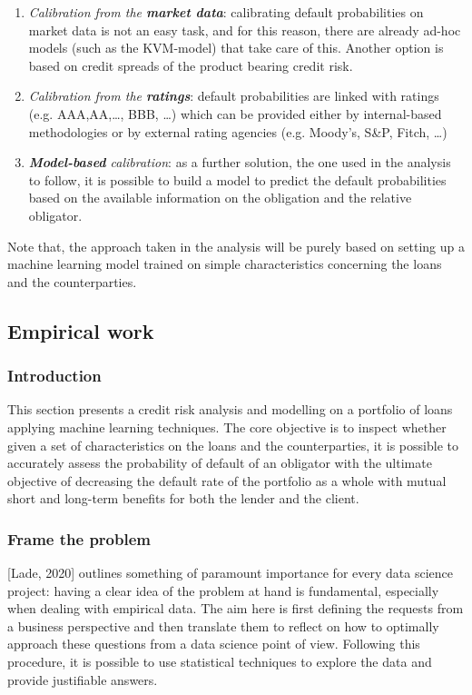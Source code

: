 \documentclass[a4paper,12pt]{article}
\begin{document}
    \begin{enumerate}     
        \item \textit{Calibration from the \textbf{market data}}: calibrating default probabilities on market data is not an easy task, and for this reason, there are already ad-hoc models (such as the KVM-model) that take care of this. Another option is based on credit spreads of the product bearing credit risk.     
        \item \textit{Calibration from the \textbf{ratings}}: default probabilities are linked with ratings (e.g. AAA,AA,\dots, BBB, \dots) which can be provided either by internal-based methodologies or by external rating agencies (e.g. Moody's, S\&P, Fitch, \dots)     
        \item \textit{\textbf{Model-based} calibration}: as a further solution, the one used in the analysis to follow, it is possible to build a model to predict the default probabilities based on the available information on the obligation and the relative obligator. 
    \end{enumerate}
    
    Note that, the approach taken in the analysis will be purely based on setting up a 
    machine learning model trained on simple characteristics concerning the loans and the counterparties.
    
    \pagebreak
    \subsection[]{Empirical work}

    \subsubsection*{Introduction}
    This section presents a credit risk analysis and modelling on a portfolio of loans applying machine learning techniques. 
    The core objective is to inspect whether given a set of characteristics on the loans and the counterparties, 
    it is possible to accurately assess the probability of default of an obligator with the ultimate objective of decreasing 
    the default rate of the portfolio as a whole with mutual short and long-term benefits for both the lender and the client.
    
    \subsubsection*{Frame the problem}
    [Lade, 2020] outlines something of paramount importance for every data science project: having a 
    clear idea of the problem at hand is fundamental, especially when dealing with empirical data. The aim here is first 
    defining the requests from a business perspective and then translate them to reflect on how to optimally approach these 
    questions from a data science point of view. Following this procedure, it is possible to use statistical techniques to 
    explore the data and provide justifiable answers.
    
\end{document}
